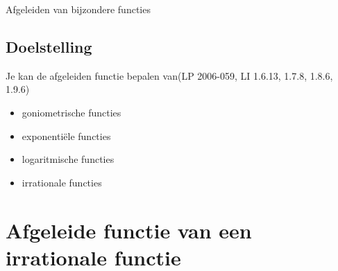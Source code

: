 \documentclass[a4paper,12pt]{article}
\begin{document}
\pagestyle{fancy}
\lhead{}

\begin{theorie}

\thispagestyle{empty}
\begin{center}
  \begin{mdframed}
  \centering
  \fontsize{40}{50}\selectfont Afgeleiden van bijzondere functies
  \end{mdframed}
  \vfill
  \vfill
\end{center}
\subsection*{Doelstelling}
Je kan de afgeleiden functie bepalen van\hfill  {\scriptsize(LP 2006-059, LI 1.6.13, 1.7.8, 1.8.6, 1.9.6)}
\begin{itemize}
  \item goniometrische functies
  \item exponentiële functies
  \item logaritmische functies
  \item irrationale functies
\end{itemize}


\pagestyle{empty}
\mbox{}
\newpage
\clearpage
\thispagestyle{empty}
\tableofcontents
\newpage
\clearpage
{}

\pagestyle{fancy}
\lhead{}

\end{theorie}

\onehalfspacing

\section{Afgeleide functie van een irrationale functie}
\end{document}
